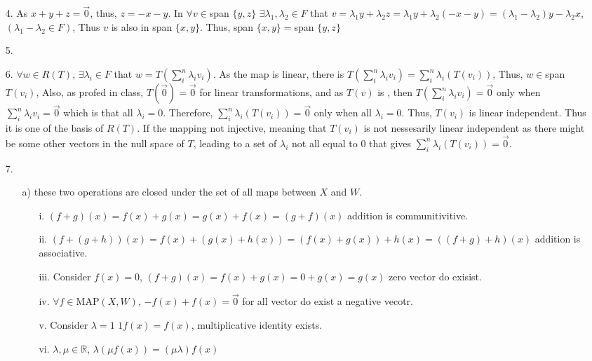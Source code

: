 \documentclass{article}
\begin{document}
\begin{itemize}
\begin{itemize}
    \end{itemize}
    \item[4.] As \(x+y+z = \overrightarrow{0}\), thus, \(z = -x-y\). In \(\forall v\in\)span \(\{y,z\}\)
    \(\exists \lambda_1,\lambda_2\in F\) that \(v=\lambda_1y+\lambda_2z=\lambda_1y+\lambda_2(-x-y)=(\lambda_1-\lambda_2)y-\lambda_2x\), \((\lambda_1-\lambda_2 \in F)\), Thus \(v\) is also in 
    span \(\{x,y\}\). Thus, span \(\{x,y\}=\)span \(\{y,z\}\)
    \item[5.] 
    \item[6.] \(\forall w\in R(T)\), \(\exists\lambda_i\in F\) that \(w = T(\sum_i^n\lambda_i v_i)\). As the map is linear,
    there is \(T(\sum_i^n\lambda_i v_i)=\sum_i^n \lambda_i(T(v_i))\), Thus, \(w\in\)span \(T(v_i)\), Also, as profed in class, \(T(\overrightarrow{0}) = \overrightarrow{0}\) for linear transformations, and as \(T(v)\) is ,
    then \(T(\sum_i^n\lambda_i v_i)=\overrightarrow{0}\) only when \(\sum_i^n\lambda_i v_i = \overrightarrow{0}\) which is that all \(\lambda_i = 0\).
    Therefore, \(\sum_i^n \lambda_i(T(v_i))=\overrightarrow{0}\) only when all \(\lambda_i = 0\). Thus, \(T(v_i)\) is linear independent. Thus it is one of the basis of \(R(T)\). If the mapping not injective,
    meaning that \(T(v_i)\) is not nessesarily linear independent as there might be some other vectors in the null space of \(T\), leading to a set of \(\lambda_i\) not all equal to 0 that gives \(\sum_i^n \lambda_i(T(v_i))=\overrightarrow{0}\).
    \item[7.]
    \begin{itemize}
        \item [a)] these two operations are closed under the set of all maps between \(X\) and \(W\). 
        \begin{itemize}
            \item [i.] \((f+g)(x)=f(x)+g(x)=g(x)+f(x)=(g+f)(x)\) addition is communitivitive.
            \item [ii.] \((f+(g+h))(x)=f(x)+(g(x)+h(x))=(f(x)+g(x))+h(x)=((f+g)+h)(x)\) addition is associative.
            \item [iii.] Consider \(f(x)=0\), \((f+g)(x) = f(x)+g(x)=0+g(x)=g(x)\) zero vector do exisist.
            \item [iv.] \(\forall f \in \)MAP\((X,W)\), \(-f(x)+f(x) = \overrightarrow{0}\) for all vector do exist a negative vecotr.
            \item [v.] Consider \(\lambda = 1\) \(1f(x) = f(x)\), multiplicative identity exists.
            \item [vi.] \(\lambda,\mu\in\mathbb{R}\), \(\lambda(\mu f(x))=(\mu\lambda)f(x)\)

\end{itemize}
\end{itemize}
\end{itemize}
\end{document}
